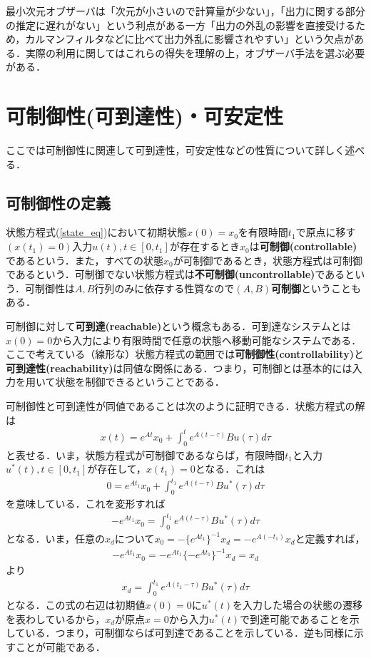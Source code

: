 最小次元オブザーバは「次元が小さいので計算量が少ない」，「出力に関する部分の推定に遅れがない」という利点がある一方「出力の外乱の影響を直接受けるため，カルマンフィルタなどに比べて出力外乱に影響されやすい」という欠点がある．実際の利用に関してはこれらの得失を理解の上，オブザーバ手法を選ぶ必要がある．

\section{可制御性(可到達性)・可安定性}

ここでは可制御性に関連して可到達性，可安定性などの性質について詳しく述べる．


\subsection{可制御性の定義}

状態方程式(\ref{state_eq})において初期状態$x(0)=x_0$を有限時間$t_1$で原点に移す$(x(t_1)=0)$入力$u(t), t\in[0,t_1]$が存在するとき$x_0$は{\bf 可制御(controllable)}であるという．また，すべての状態$x_0$が可制御であるとき，状態方程式は可制御であるという．可制御でない状態方程式は{\bf 不可制御(uncontrollable)}であるという．可制御性は$A,B$行列のみに依存する性質なので{\bf $(A,B)$可制御}ということもある．

可制御に対して{\bf 可到達(reachable)}という概念もある．可到達なシステムとは$x(0)=0$から入力により有限時間で任意の状態へ移動可能なシステムである．ここで考えている（線形な）状態方程式の範囲では{\bf 可制御性(controllability)}と{\bf 可到達性(reachability)}は同値な関係にある．つまり，可制御とは基本的には入力を用いて状態を制御できるということである．

可制御性と可到達性が同値であることは次のように証明できる．状態方程式の解は
\begin{align}
	x(t) = e^{At} x_0 + \int_0^t e^{A(t-\tau)} B u (\tau) d \tau
\end{align}
と表せる．いま，状態方程式が可制御であるならば，有限時間$t_1$と入力$u^*(t), t\in[0,t_1]$が存在して，$x(t_1)=0$となる．これは
\begin{align}
	0 = e^{At_1} x_0 + \int_0^{t_1} e^{A(t-\tau)} B u^* (\tau) d \tau
\end{align}
を意味している．これを変形すれば
\begin{align}
	-e^{At_1} x_0 = \int_0^{t_1} e^{A(t-\tau)} B u^* (\tau) d \tau
\end{align}
となる．いま，任意の$x_d$について$x_0=-\{e^{At_1} \}^{-1}x_d = -e^{A(-t_1)} x_d$と定義すれば，
\begin{align}
	-e^{At_1} x_0 = -e^{At_1} \{-e^{At_1} \}^{-1}x_d = x_d
\end{align}
より
\begin{align}
	x_d = \int_0^{t_1} e^{A(t_1-\tau)} B u^* (\tau) d \tau
\end{align}
となる．この式の右辺は初期値$x(0)=0$に$u^*(t)$を入力した場合の状態の遷移を表わしているから，$x_d$が原点$x=0$から入力$u^*(t)$で到達可能であることを示している．つまり，可制御ならば可到達であることを示している．逆も同様に示すことが可能である．

